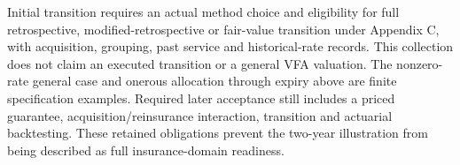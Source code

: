 Initial transition requires an actual method choice and eligibility for full retrospective, modified-retrospective or fair-value transition under Appendix C, with acquisition, grouping, past service and historical-rate records. This collection does not claim an executed transition or a general VFA valuation. The nonzero-rate general case and onerous allocation through expiry above are finite specification examples. Required later acceptance still includes a priced guarantee, acquisition/reinsurance interaction, transition and actuarial backtesting. These retained obligations prevent the two-year illustration from being described as full insurance-domain readiness.

